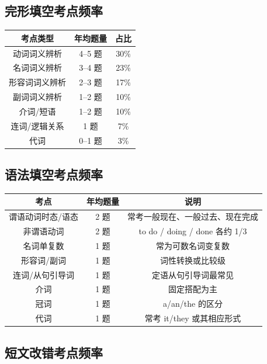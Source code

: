 \subsection{完形填空考点频率}

\begin{center}
\begin{tabular}{c|c|c}
\textbf{考点类型} & \textbf{年均题量} & \textbf{占比} \\ \toprule
动词词义辨析 & 4--5 题 & 30\% \\
名词词义辨析 & 3--4 题 & 23\% \\
形容词词义辨析 & 2--3 题 & 17\% \\
副词词义辨析 & 1--2 题 & 10\% \\
介词/短语 & 1--2 题 & 10\% \\
连词/逻辑关系 & 1 题 & 7\% \\
代词 & 0--1 题 & 3\% \\
\bottomrule
\end{tabular}
\end{center}

\subsection{语法填空考点频率}

\begin{center}
\begin{tabular}{c|c|c}
\textbf{考点} & \textbf{年均题量} & \textbf{说明} \\ \toprule
谓语动词时态/语态 & 2 题 & 常考一般现在、一般过去、现在完成 \\
非谓语动词 & 2 题 & to do / doing / done 各约 1/3 \\
名词单复数 & 1 题 & 常为可数名词变复数 \\
形容词/副词 & 1 题 & 词性转换或比较级 \\
连词/从句引导词 & 1 题 & 定语从句引导词最常见 \\
介词 & 1 题 & 固定搭配为主 \\
冠词 & 1 题 & a/an/the 的区分 \\
代词 & 1 题 & 常考 it/they 或其相应形式 \\
\bottomrule
\end{tabular}
\end{center}

\subsection{短文改错考点频率}


